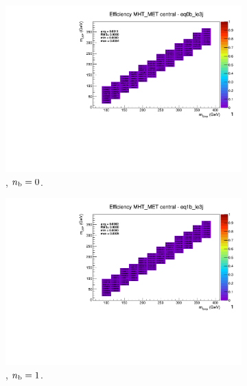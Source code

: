 \begin{figure}[h!]
  \centering
  \begin{subfigure}[b]{0.4\textwidth}
    \includegraphics[width=\textwidth, page=5]{Figs/sms/t2degen/v19/systs/T2_4body_MHT_MET_eq0b_le3j.pdf}
    \caption{\njlow, $n_{\text{b}} = 0$.}
  \end{subfigure}
  \begin{subfigure}[b]{0.4\textwidth}
    \includegraphics[width=\textwidth, page=5]{Figs/sms/t2degen/v19/systs/T2_4body_MHT_MET_eq1b_le3j.pdf}
    \caption{\njlow, $n_{\text{b}} = 1$.}
  \end{subfigure}\\
  \begin{subfigure}[b]{0.4\textwidth}

\end{subfigure}
\end{figure}
